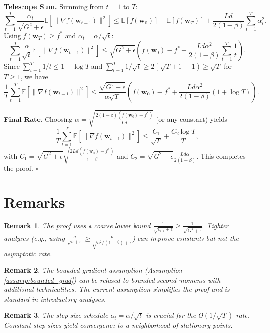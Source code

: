 \documentclass{article}
\newcommand{\E}{\mathbb{E}}
\newcommand{\norm}[1]{\|#1\|}
\newcommand{\grad}{\nabla}
\newcommand{\step}[1]{\text{[Step #1]}}
\newcommand{\vect}[1]{\bm{#1}}
\newtheorem{remark}{Remark}
\begin{document}
\step{6} \textbf{Telescope Sum.} Summing from \(t=1\) to \(T\):
\[
\sum_{t=1}^T \frac{\alpha_t}{\sqrt{G^2 + \epsilon}} \E[\norm{\grad f(\vect{w}_{t-1})}^2] \le \E[f(\vect{w}_0)] - \E[f(\vect{w}_T)] + \frac{L d}{2(1-\beta)} \sum_{t=1}^T \alpha_t^2.
\]
Using \(f(\vect{w}_T) \ge f^*\) and \(\alpha_t = \alpha / \sqrt{t}\):
\[
\sum_{t=1}^T \frac{\alpha}{\sqrt{t}} \E[\norm{\grad f(\vect{w}_{t-1})}^2] \le \sqrt{G^2 + \epsilon} \left( f(\vect{w}_0) - f^* + \frac{L d \alpha^2}{2(1-\beta)} \sum_{t=1}^T \frac{1}{t} \right).
\]
Since \(\sum_{t=1}^T 1/t \le 1 + \log T\) and \(\sum_{t=1}^T 1/\sqrt{t} \ge 2(\sqrt{T+1}-1) \ge \sqrt{T}\) for \(T \ge 1\), we have
\[
\frac{1}{T} \sum_{t=1}^T \E[\norm{\grad f(\vect{w}_{t-1})}^2] \le \frac{\sqrt{G^2 + \epsilon}}{\alpha \sqrt{T}} \left( f(\vect{w}_0) - f^* + \frac{L d \alpha^2}{2(1-\beta)} (1 + \log T) \right).
\]

\step{7} \textbf{Final Rate.} Choosing \(\alpha = \sqrt{\frac{2(1-\beta)(f(\vect{w}_0)-f^*)}{L d}}\) (or any constant) yields
\[
\frac{1}{T} \sum_{t=1}^T \E[\norm{\grad f(\vect{w}_{t-1})}^2] \le \frac{C_1}{\sqrt{T}} + \frac{C_2 \log T}{T},
\]
with \(C_1 = \sqrt{G^2 + \epsilon} \sqrt{\frac{2 L d (f(\vect{w}_0)-f^*)}{1-\beta}}\) and \(C_2 = \sqrt{G^2 + \epsilon} \frac{L d \alpha}{2(1-\beta)}\). This completes the proof. \(\square\)


\section{Remarks}

\begin{remark}
The proof uses a coarse lower bound \(\frac{1}{\sqrt{v_{t,i}+\epsilon}} \ge \frac{1}{\sqrt{G^2+\epsilon}}\). Tighter analyses (e.g., using \(\frac{a}{\sqrt{b+\epsilon}} \ge \frac{a}{\sqrt{a^2/(1-\beta)+\epsilon}}\)) can improve constants but not the asymptotic rate.
\end{remark}

\begin{remark}
The bounded gradient assumption (Assumption \ref{assump:bounded_grad}) can be relaxed to bounded second moments with additional technicalities. The current assumption simplifies the proof and is standard in introductory analyses.
\end{remark}

\begin{remark}
The step size schedule \(\alpha_t = \alpha/\sqrt{t}\) is crucial for the \(O(1/\sqrt{T})\) rate. Constant step sizes yield convergence to a neighborhood of stationary points.
\end{remark}
\end{document}
